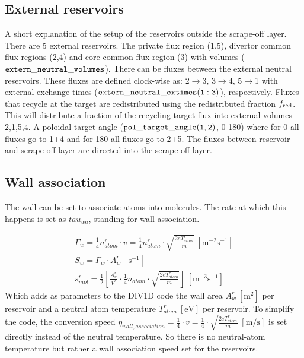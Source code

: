 \documentclass[amsmath,amssymb,a4]{revtex4-2}
\begin{document}
\subsection{External reservoirs}
A short explanation of the setup of the reservoirs outside the scrape-off layer. There are 5 external reservoirs. The private flux region (1,5), divertor common flux regions (2,4) and core common flux region (3) with volumes ($\tt extern\_neutral\_volumes$). There can be fluxes between the external neutral reservoirs. These fluxes are defined clock-wise as: 2$\rightarrow$3, 3$\rightarrow$4,  5$\rightarrow$1 with external exchange times ($\tt extern\_neutral\_extimes(1:3)$), respectively. Fluxes that recycle at the target are redistributed using the redistributed fraction $f_{\rm red}$. This will distribute a fraction of the recycling target flux into external volumes 2,1,5,4. A poloidal target angle ($\tt pol\_target\_angle(1,2)$, 0-180) where for 0 all fluxes go to 1+4 and for 180 all fluxes go to 2+5. The fluxes between reservoir and scrape-off layer are directed into the scrape-off layer.

\subsection{Wall association}
The wall can be set to associate atoms into molecules.
The rate at which this happens is set as $tau_{wa}$, standing for wall association.

\begin{equation}
    \begin{aligned}
        \Gamma_w = \frac{1}{4}n^r_{atom} \cdot v 
        =  \frac{1}{4}n^r_{atom} \cdot \sqrt{\frac{2 e T^r_{atom}}{m}} ~\mathrm{[m^{-2} s^{-1}]} \\
        S_w = \Gamma_w \cdot A^r_w ~\mathrm{[ s^{-1}]} \\
        s^r_{mol} =\frac{1}{2} \left[ \frac{A^r_w}{ V^r} \cdot \frac{1}{4}n_{atom} \cdot \sqrt{\frac{2 e T^r_{atom}}{m}}\right]~\mathrm{[m^{-3} s^{-1}]}
    \end{aligned}
\end{equation}
Which adds as parameters to the DIV1D code the wall area $A^r_w~\mathrm{[m^2]}$ per reservoir and a neutral atom temperature $T^r_{atom}~\mathrm{[eV]}$ per reservoir. To simplify the code, the conversion speed $\eta_{wall,association}= \frac{1}{4} \cdot v 
        =  \frac{1}{4}\cdot\sqrt{\frac{2 e T^r_{atom}}{m}}~\mathrm{[m/s]}$ is set directly instead of the neutral temperature. 
        So there is no neutral-atom temperature but rather a wall association speed set for the reservoirs. 
\end{document}
